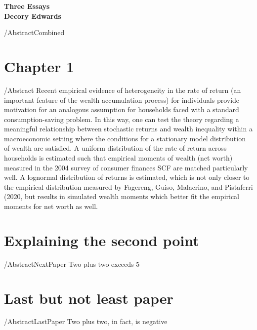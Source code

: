 \documentclass{scrartcl}
\begin{document}
\begin{center}
{\Large \textbf{Three Essays}}
\\[5pt]
{\large \textbf{Decory Edwards}}

\end{center}

\begin{verbatimwrite}{\abstractpath/AbstractCombined\mymoniker}
  
\end{verbatimwrite}


\section{Chapter 1}
\begin{verbatimwrite}{\abstractpath/Abstract\mymoniker}
  Recent empirical evidence of heterogeneity in the rate of return (an important feature of the wealth accumulation process) for individuals provide motivation for an analogous assumption for households faced with a standard consumption-saving problem. In this way, one can test the theory regarding a meaningful relationship between stochastic returns and wealth inequality within a macroeconomic setting where the conditions for a stationary model distribution of wealth are satisfied. A uniform distribution of the rate of return across households is estimated such that empirical moments of wealth (net worth) measured in the 2004 survey of consumer finances SCF are matched particularly well. A lognormal distribution of returns is estimated, which is not only closer to the empirical distribution measured by Fagereng, Guiso, Malacrino, and Pistaferri (2020, but results in simulated wealth moments which better fit the empirical moments for net worth as well.
\end{verbatimwrite}


\section{Explaining the second point}
\begin{verbatimwrite}{\abstractpath/AbstractNextPaper\mymoniker}
  Two plus two exceeds 5
\end{verbatimwrite}


\section{Last but not least paper}
\begin{verbatimwrite}{\abstractpath/AbstractLastPaper\mymoniker}
  Two plus two, in fact, is negative
\end{verbatimwrite}

\end{document}
